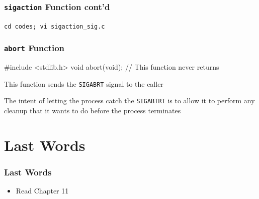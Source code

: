 \documentclass[newPxFont,sthlmFooter,nooffset]{beamer}
\begin{document}
\begin{frame}[fragile,t]
  \frametitle{\texttt{sigaction} Function cont'd}
\texttt{cd codes; vi sigaction\_sig.c}


\end{frame}

\begin{frame}[containsverbatim,t]
  \frametitle{\texttt{abort} Function}
\begin{codedef}
#include <stdlib.h>
void abort(void);
// This function never returns  
\end{codedef}

This function sends the \texttt{SIGABRT} signal to the caller

The intent of letting the process catch the \texttt{SIGABTRT} is to allow it to perform any cleanup that it wants to do before the process terminates

\end{frame}



\section{Last Words}

\begin{frame}[t]
  \frametitle{Last Words}

\begin{itemize}
\item Read Chapter 11
\end{itemize}
\end{frame}
\end{document}
